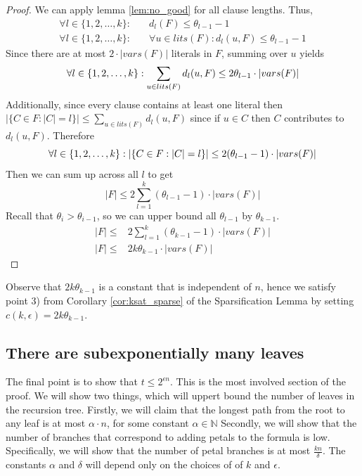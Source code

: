 \begin{proof}
    We can apply lemma \ref{lem:no_good} for all clause lengths.
    Thus, 
    \begin{align}
        \forall l \in \{1,2,\dots,k\}:& \quad d_l(F) \leq \theta_{l - 1} - 1 \\
        \forall l \in \{1,2,\dots,k\}:& \quad \forall u \in lits(F): d_l(u, F) \leq \theta_{l-1}-1
    \end{align}
    Since there are at most $2 \cdot |vars(F)|$ literals in $F$, summing over $u$ yields
    \begin{equation}
        \forall l \in \{1,2,\dots,k\}: \sum_{u \in lits(F)} d_l(u, F) \leq 2\theta_{l-1}\cdot |vars(F)| \\
    \end{equation}
    Additionally, since every clause contains at least one literal then 
    $|\{C \in F : |C| = l\}| \leq \sum_{u \in lits(F)} d_l(u, F)$ since if $u \in C$ then $C$ contributes to $d_l(u, F)$.
    Therefore
    \begin{equation} \label{eq:clauses_size_l}
        \forall l \in \{1,2,\dots,k\}: |\{C \in F : |C| = l\}| \leq 2(\theta_{l-1} - 1) \cdot |vars(F)| \\
    \end{equation}
    Then we can sum up across all $l$ to get
    \begin{equation}
        |F| \leq 2 \sum_{l=1}^{k}(\theta_{l-1} - 1) \cdot |vars(F)|
    \end{equation}
    Recall that $\theta_i > \theta_{i-1}$, so we can upper bound all $\theta_{l-1}$ by $\theta_{k-1}$.
    \begin{align}
        |F| \leq& 2 \sum_{l=1}^{k}(\theta_{k-1} - 1) \cdot |vars(F)| \\
        |F| \leq& 2k\theta_{k-1} \cdot |vars(F)|
    \end{align}
\end{proof}

Observe that $2k\theta_{k-1}$ is a constant that is independent of $n$, hence we satisfy point 3)
from Corollary \ref{cor:ksat_sparse} of the Sparsification Lemma by setting $c(k,\epsilon) = 2k\theta_{k-1}$.

\subsection{There are subexponentially many leaves}

The final point is to show that $t \leq 2^{\epsilon n}$. This is 
the most involved section of the proof. We will show two things, which
will uppert bound the number of leaves in the recursion tree. Firstly, we will
claim that the longest path from the root to any leaf is at most $\alpha \cdot n$,
for some constant $\alpha \in \mathbb{N}$
Secondly, we will show that the number of branches that correspond to adding
petals to the formula is low. Specifically, we will show that the number of 
petal branches is at most $\frac{kn}{\delta}$. The constants $\alpha$ and $\delta$ will depend only
on the choices of of $k$ and $\epsilon$.

